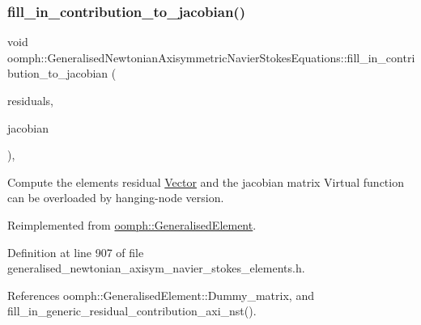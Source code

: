 \subsubsection{\texorpdfstring{fill\+\_\+in\+\_\+contribution\+\_\+to\+\_\+jacobian()}{fill\_in\_contribution\_to\_jacobian()}}
{\footnotesize\ttfamily void oomph\+::\+Generalised\+Newtonian\+Axisymmetric\+Navier\+Stokes\+Equations\+::fill\+\_\+in\+\_\+contribution\+\_\+to\+\_\+jacobian (\begin{DoxyParamCaption}\item[{\hyperlink{classoomph_1_1Vector}{Vector}$<$ double $>$ \&}]{residuals,  }\item[{\hyperlink{classoomph_1_1DenseMatrix}{Dense\+Matrix}$<$ double $>$ \&}]{jacobian }\end{DoxyParamCaption})\hspace{0.3cm}{\ttfamily [inline]}, {\ttfamily [virtual]}}



Compute the element\textquotesingle{}s residual \hyperlink{classoomph_1_1Vector}{Vector} and the jacobian matrix Virtual function can be overloaded by hanging-\/node version. 



Reimplemented from \hyperlink{classoomph_1_1GeneralisedElement_a6ae09fc0d68e4309ac1b03583d252845}{oomph\+::\+Generalised\+Element}.



Definition at line 907 of file generalised\+\_\+newtonian\+\_\+axisym\+\_\+navier\+\_\+stokes\+\_\+elements.\+h.



References oomph\+::\+Generalised\+Element\+::\+Dummy\+\_\+matrix, and fill\+\_\+in\+\_\+generic\+\_\+residual\+\_\+contribution\+\_\+axi\+\_\+nst().

\mbox{\label{classoomph_1_1GeneralisedNewtonianAxisymmetricNavierStokesEquations_ad682da5b2fcbdf34c538a8aa54350aef}} 
